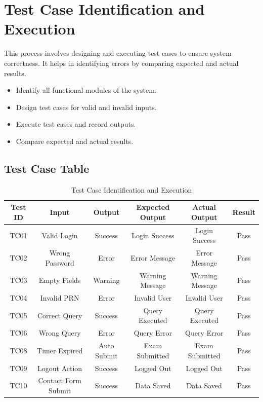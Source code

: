 \documentclass{SSBT-BE}
\begin{document}
\section{Test Case Identification and Execution}
This process involves designing and executing test cases to ensure system correctness.
It helps in identifying errors by comparing expected and actual results.
\begin{itemize}
    \item Identify all functional modules of the system.
    \item Design test cases for valid and invalid inputs.
    \item Execute test cases and record outputs.
    \item Compare expected and actual results.
\end{itemize}
\subsection{Test Case Table}

\renewcommand{\arraystretch}{1.3}

\begin{table}[H]
\centering
\begin{tabular}{|c|c|c|c|c|c|}
\hline
Test ID & Input & Output & Expected Output & Actual Output & Result \\
\hline
TC01 & Valid Login & Success & Login Success & Login Success & Pass \\
\hline
TC02 & Wrong Password & Error & Error Message & Error Message & Pass \\
\hline
TC03 & Empty Fields & Warning & Warning Message & Warning Message & Pass \\
\hline
TC04 & Invalid PRN & Error & Invalid User & Invalid User & Pass \\
\hline
TC05 & Correct Query & Success & Query Executed & Query Executed & Pass \\
\hline
TC06 & Wrong Query & Error & Query Error & Query Error & Pass \\


\hline
TC08 & Timer Expired & Auto Submit & Exam Submitted & Exam Submitted & Pass \\
\hline
TC09 & Logout Action & Success & Logged Out & Logged Out & Pass \\

\hline
TC10 & Contact Form Submit & Success & Data Saved & Data Saved & Pass \\
\hline
\end{tabular}
\caption{Test Case Identification and Execution}
\end{table}
\end{document}

